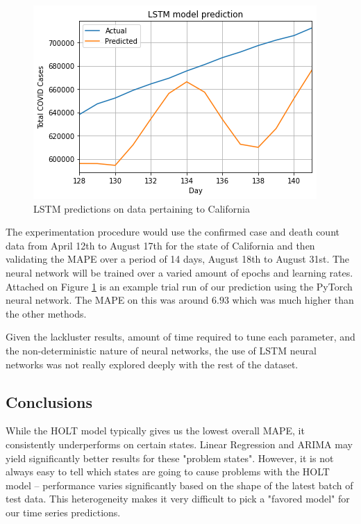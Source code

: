 \documentclass[sigconf,nonacm]{acmart}
\begin{document}
\begin{figure}
  \centering
  \includegraphics[width=\linewidth]{figures/LSTMPytorch.png}
  \caption{LSTM predictions on data pertaining to California}
  \label{fig:LSTM_trial}
\end{figure} 

The experimentation procedure would use the confirmed case and death count data
from April 12th to August 17th for the state of California and then validating
the MAPE over a period of 14 days, August 18th to August 31st. The neural
network will be trained over a varied amount of epochs and learning rates. 
Attached on Figure  \ref{fig:LSTM_trial} is an example trial run of our
prediction using the PyTorch neural network. The MAPE on this was around $6.93$
which was much higher than the other methods.

Given the lackluster results, amount of time required to tune each parameter,
and the non-deterministic nature of neural networks, the use of LSTM neural
networks was not really explored deeply with the rest of the dataset.

\subsection{Conclusions}

While the HOLT model typically gives us the lowest overall MAPE, it
consistently underperforms on certain states. Linear Regression and ARIMA may
yield significantly better results for these "problem states". However, it is
not always easy to tell which states are going to cause problems with the HOLT
model -- performance varies significantly based on the shape of the latest
batch of test data. This heterogeneity makes it very difficult to pick a
"favored model" for our time series predictions. 
\end{document}
